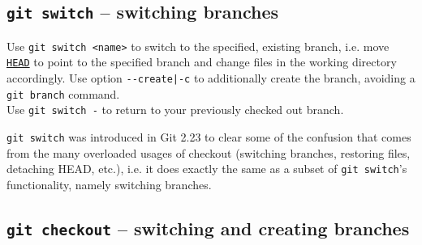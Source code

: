 \documentclass[8pt, table, xcdraw]{article}%
\begin{document}
\subsection{\lstinline{git switch} -- switching branches} \label{switch}

Use \lstinline{git switch <name>} to switch to the specified, existing branch, i.e. move \hyperref[branching]{\lstinline{HEAD}} to point to the specified branch and change files in the working directory accordingly. Use option \lstinline{--create|-c} to additionally create the branch, avoiding a \lstinline{git branch} command.\\
Use \lstinline{git switch -} to return to your previously checked out branch.

\lstinline{git switch} was introduced in Git 2.23 to clear some of the confusion that comes from the many overloaded usages of checkout (switching branches, restoring files, detaching HEAD, etc.), i.e. it does exactly the same as a subset of \lstinline{git switch}'s functionality, namely switching branches.

\subsection{\lstinline{git checkout} -- switching and creating branches} \label{checkout}
\end{document}
